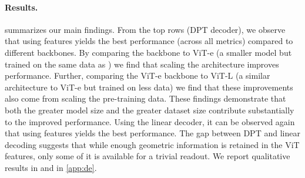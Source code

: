 \paragraph{Results.}
 summarizes our main findings.
From the top rows (DPT decoder), we observe that using \chonk features yields the best performance (across all metrics) compared to different backbones. By comparing the \chonk backbone to ViT-e (a smaller model but trained on the same data as \chonk) we find that scaling the architecture improves performance. Further, comparing the ViT-e backbone to ViT-L (a similar architecture to ViT-e but trained on less data) we find that these improvements also come from scaling the pre-training data. These findings demonstrate that both the greater model size and the greater dataset size contribute substantially to the improved performance.
Using the linear decoder, it can be observed again that using \chonk features yields the best performance.
The gap between DPT and linear decoding suggests that while enough geometric information is retained in the ViT features, only some of it is available for a trivial readout.
We report qualitative results in  and  in \cref{app:de}.



